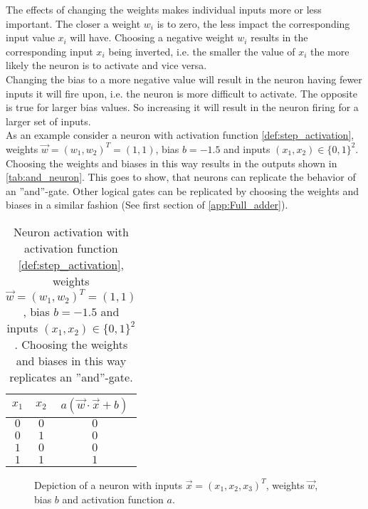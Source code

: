 The effects of changing the weights makes individual inputs more or less important. The closer a weight $w_i$ is to zero, the less impact the corresponding input value $x_i$ will have. Choosing a negative weight $w_i$ results in the corresponding input $x_i$ being inverted, i.e. the smaller the value of $x_i$ the more likely the neuron is to activate and vice versa.\\
Changing the bias to a more negative value will result in the neuron having fewer inputs it will fire upon, i.e. the neuron is more difficult to activate. The opposite is true for larger bias values. So increasing it will result in the neuron firing for a larger set of inputs.\\
As an example consider a neuron with activation function \eqref{def:step_activation}, weights $\vec{w}={(w_1, w_2)}^T=(1, 1)$, bias $b=-1.5$ and inputs $(x_1,x_2)\in{\{0,1\}}^2$. Choosing the weights and biases in this way results in the outputs shown in \autoref{tab:and_neuron}. This goes to show, that neurons can replicate the behavior of an ''and''-gate. Other logical gates can be replicated by choosing the weights and biases in a similar fashion (See first section of \autoref{app:Full_adder}).
\begin{table}
\begin{center}
\begin{tabular}{c c|c}
$x_1$ & $x_2$ & $a(\vec{w}\cdot\vec{x}+b)$\\
\hline
$0$ & $0$ & $0$\\
$0$ & $1$ & $0$\\
$1$ & $0$ & $0$\\
$1$ & $1$ & $1$\\
\end{tabular}
\caption{Neuron activation with activation function \eqref{def:step_activation}, weights $\vec{w}={(w_1, w_2)}^T=(1, 1)$, bias $b=-1.5$ and inputs $(x_1,x_2)\in{\{0,1\}}^2$. Choosing the weights and biases in this way replicates an ''and''-gate.}\label{tab:and_neuron}
\end{center}
\end{table}

\begin{figure}
\centering

\caption{Depiction of a neuron with inputs $\vec{x}={(x_1, x_2, x_3)}^T$, weights $\vec{w}$, bias $b$ and activation function $a$.}\label{fig:neuron}
\end{figure}

